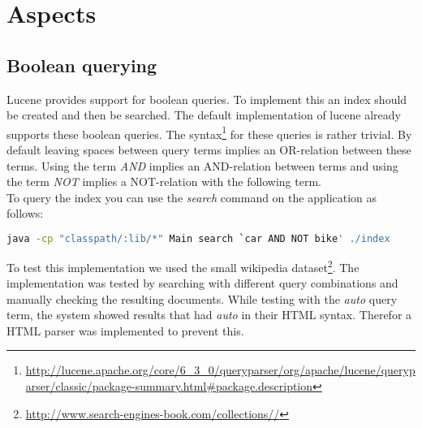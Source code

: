 \documentclass{article}
\begin{document}
\section{Aspects}
\subsection{Boolean querying}
Lucene provides support for boolean queries. To implement this an index should be created and then be searched. The default implementation of lucene already supports these boolean queries. The syntax\footnote{\url{http://lucene.apache.org/core/6_3_0/queryparser/org/apache/lucene/queryparser/classic/package-summary.html#package.description}} for these queries is rather trivial. By default leaving spaces between query terms implies an OR-relation between these terms. Using the term \emph{AND} implies an AND-relation between terms and using the term \emph{NOT} implies a NOT-relation with the following term.\\
To query the index you can use the \emph{search} command on the application as follows:
\begin{lstlisting}[language=Bash, label={lst:search}]
java -cp "classpath/:lib/*" Main search `car AND NOT bike' ./index
\end{lstlisting}
To test this implementation we used the small wikipedia dataset\footnote{\url{http://www.search-engines-book.com/collections//}}. The implementation was tested by searching with different query combinations and manually checking the resulting documents. While testing with the \emph{auto} query term, the system showed results that had \emph{auto} in their HTML syntax. Therefor a HTML parser was implemented to prevent this.
\end{document}
